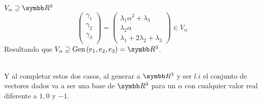 \begin{mathcase}{\(V_\alpha \supseteq \realR^3\)}
\[\begin{pmatrix}
                \gamma_1 \\
                \gamma_2 \\
                \gamma_3 \\
            \end{pmatrix}
            =
            \begin{pmatrix}
                \lambda_1\alpha^2 + \lambda_3 \\
                \lambda_2\alpha \\
                \lambda_1 + 2\lambda_2 + \lambda_3
            \end{pmatrix}
            \in V_\alpha
        \]
        Resultando que \(V_\alpha \supseteq \pgen{e_1, e_2, e_3} = \realR^3\).
    \end{mathcase}
    \\[0.25cm]
    Y al completar estos dos casos, al generar a \(\realR^3\) y ser \(l.i\) el conjunto de vectores dados va a ser una 
    base de \(\realR^3\) para un \(\alpha\) con cualquier valor real diferente a \(1, 0\) y \(-1\).
